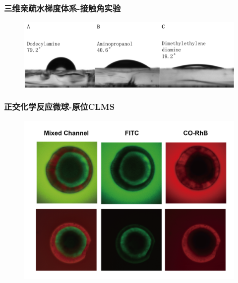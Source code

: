 \documentclass{beamer}
\begin{document}
\begin{frame}
  \frametitle{三维亲疏水梯度体系-接触角实验}
  \begin{figure}
    \begin{center}
      \includegraphics[width=\linewidth]{figures/ch3/FigureS3.png}
    \end{center}
  \end{figure}
\end{frame}

\begin{frame}
  \frametitle{正交化学反应微球-原位CLMS}
  \begin{figure}
    \begin{center}
      \includegraphics[width=0.8\linewidth]{figures/ch3/dualstain.png}
    \end{center}
  \end{figure}
\end{frame}
\end{document}
